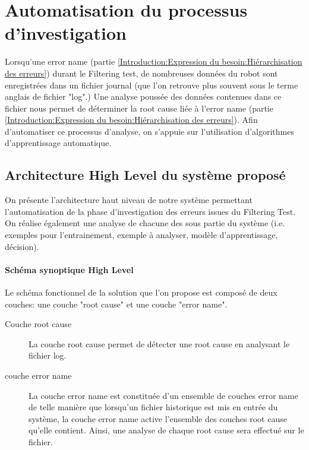 \chapter{Automatisation du processus d'investigation}
\label{Automatisation du processus d'investigation}
\thispagestyle{fancy}
Lorsqu'une error name (partie \ref{Introduction:Expression du besoin:Hiérarchisation des erreurs}) durant le Filtering test, de nombreuses données du robot sont enregistrées dans un fichier journal (que l'on retrouve plus souvent sous le terme anglais de fichier "log".) Une analyse poussée des données contenues dans ce fichier nous permet de déterminer la root cause liée à l'error name (partie \ref{Introduction:Expression du besoin:Hiérarchisation des erreurs}). Afin d'automatiser ce processus d'analyse, on s'appuie sur l'utilisation d'algorithmes d'apprentissage automatique.

\section{Architecture High Level du système proposé}
\label{Automatisation du processus d'investigation: Achitecture High Level du système proposé}
On présente l'architecture haut niveau de notre système permettant l'automatisation de la phase d'investigation des erreurs issues du Filtering Test. On réalise également une analyse de chacune des sous partie du système (i.e. exemples pour l'entrainement, exemple à analyser, modèle d'apprentissage, décision).

\subsubsection{Schéma synoptique High Level}
\label{Automatisation du processus d'investigation: Achitecture High Level du système proposé: Schéma synoptique High Level}
Le schéma fonctionnel de la solution que l'on propose est composé de deux couches: une couche "root cause" et une couche "error name".
\begin{description}
	\item [Couche root cause] La couche root cause permet de détecter une root cause en analysant le fichier log.
	\item [couche error name] La couche error name est constituée d'un ensemble de couches error name de telle manière que lorsqu'un fichier historique est mis en entrée du système, la couche error name active l'ensemble des couches root cause qu'elle contient. Ainsi, une analyse de chaque root cause sera effectué sur le fichier.
\end{description} 

